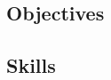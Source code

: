 \documentclass[../CHEFCookingHelperForEveryonesFridge.tex]{subfiles}
\begin{document}
\subsection{Objectives}

\subsection{Skills}

\ifSubfilesClassLoaded{
    \printbibliography
}
\end{document}
